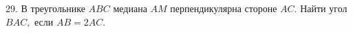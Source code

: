 29. В треугольнике $ABC$ медиана $AM$ перпендикулярна стороне $AC.$ Найти угол $BAC,$ если $AB=2AC.$\\
